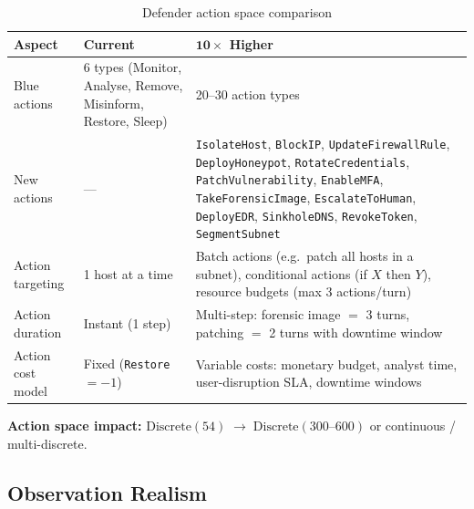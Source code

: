 \documentclass[11pt,a4paper]{article}
\begin{document}
\begin{table}[h!]
\centering
\caption{Defender action space comparison}
\label{tab:defender}
\begin{tabularx}{\textwidth}{@{} l X X @{}}
\toprule
\textbf{Aspect} & \textbf{Current} & \textbf{$\mathbf{10\times}$ Higher} \\
\midrule
Blue actions & 6 types (Monitor, Analyse, Remove, Misinform, Restore, Sleep) &
    20--30 action types \\[3pt]
New actions & --- &
    \texttt{IsolateHost}, \texttt{BlockIP}, \texttt{UpdateFirewallRule},
    \texttt{DeployHoneypot}, \texttt{RotateCredentials},
    \texttt{PatchVulnerability}, \texttt{EnableMFA},
    \texttt{TakeForensicImage}, \texttt{EscalateToHuman},
    \texttt{DeployEDR}, \texttt{SinkholeDNS}, \texttt{RevokeToken},
    \texttt{SegmentSubnet} \\[3pt]
Action targeting & 1 host at a time &
    Batch actions (e.g.\ patch all hosts in a subnet), conditional actions
    (if $X$ then $Y$), resource budgets (max 3 actions/turn) \\[3pt]
Action duration & Instant (1 step) &
    Multi-step: forensic image $=$ 3 turns, patching $=$ 2 turns with
    downtime window \\[3pt]
Action cost model & Fixed (\texttt{Restore} $= -1$) &
    Variable costs: monetary budget, analyst time, user-disruption SLA,
    downtime windows \\
\bottomrule
\end{tabularx}
\end{table}

\noindent
\textbf{Action space impact:}
$\text{Discrete}(54) \;\longrightarrow\; \text{Discrete}(300\text{--}600)$
or continuous / multi-discrete.

\subsection{Observation Realism}
\end{document}
